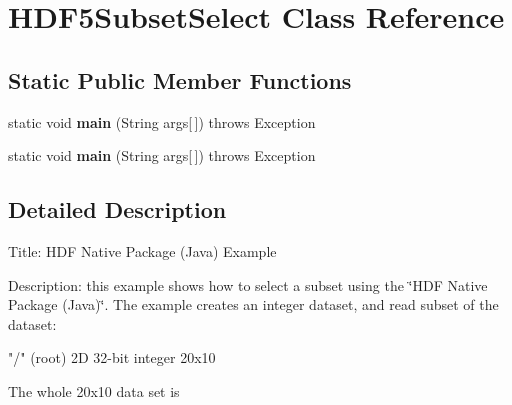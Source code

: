 \hypertarget{class_h_d_f5_subset_select}{}\section{H\+D\+F5\+Subset\+Select Class Reference}
\label{class_h_d_f5_subset_select}
\subsection*{Static Public Member Functions}
\begin{DoxyCompactItemize}
\item 
\mbox{\label{class_h_d_f5_subset_select_a2b098ed4ba3f659b45bc97d0f73a11a2}} 
static void {\bfseries main} (String args\mbox{[}$\,$\mbox{]})  throws Exception 
\item 
\mbox{\label{class_h_d_f5_subset_select_a2b098ed4ba3f659b45bc97d0f73a11a2}} 
static void {\bfseries main} (String args\mbox{[}$\,$\mbox{]})  throws Exception 
\end{DoxyCompactItemize}


\subsection{Detailed Description}
Title\+: H\+DF Native Package (Java) Example 

Description\+: this example shows how to select a subset using the \char`\"{}\+H\+D\+F Native Package (\+Java)\char`\"{}. The example creates an integer dataset, and read subset of the dataset\+:


\begin{DoxyPre}
    "/" (root)
            2D 32-bit integer 20x10
\end{DoxyPre}


The whole 20x10 data set is


